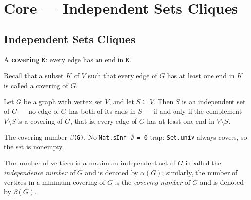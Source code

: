 \section{Core --- Independent Sets Cliques}
\subsection{Independent Sets Cliques}


\begin{definition}
\label{SimpleGraph.IsCovering}
\leanok
A \textbf{covering} \texttt{K}: every edge has an end in \texttt{K}.

Recall that a subset $K$ of $V$ such that every edge of $G$ has at least one end
in $K$ is called a covering of $G$.
\end{definition}

\begin{theorem}
\label{SimpleGraph.isIndepSet_iff_isCovering_compl}
Let $G$ be a graph with vertex set $V$, and let $S \subseteq V$. Then $S$ is an
independent set of $G$ — no edge of $G$ has both of its ends in $S$ — if and only if the
complement $V \setminus S$ is a covering of $G$, that is, every edge of $G$ has at least
one end in $V \setminus S$.
\end{theorem}

\begin{definition}
\label{SimpleGraph.coveringNumber}
\leanok
{}
The covering number \texttt{$\beta$(G)}. No \texttt{Nat.sInf $\emptyset$ = 0} trap:
\texttt{Set.univ} always covers, so the set is nonempty.

The number of vertices in a maximum independent set of $G$ is called the
\emph{independence number} of $G$ and is denoted by $\alpha(G)$; similarly, the
number of vertices in a minimum covering of $G$ is the \emph{covering number} of $G$
and is denoted by $\beta(G)$.
\end{definition}

